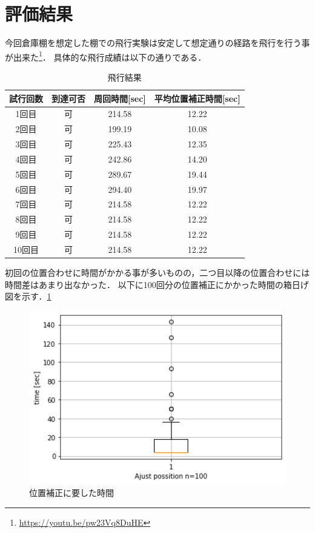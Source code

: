 \section{評価結果}
今回倉庫棚を想定した棚での飛行実験は安定して想定通りの経路を飛行を行う事が出来た\footnote{\url{https://youtu.be/pw23Vq8DuHE}}．
具体的な飛行成績は以下の通りである．

\begin{table}[h]
    \caption{飛行結果}
    \label{table:fly_result}
    \centering
    \begin{tabular}{cccc}
        \hline
        試行回数 & 到達可否 & 周回時間[sec] & 平均位置補正時間[sec] \\
        \hline \hline
        1回目 & 可 & 214.58 & 12.22 \\
        2回目 & 可 & 199.19 & 10.08 \\
        3回目 & 可 & 225.43 & 12.35 \\
        4回目 & 可 & 242.86 & 14.20 \\
        5回目 & 可 & 289.67 & 19.44 \\
        6回目 & 可 & 294.40 & 19.97 \\

        7回目 & 可 & 214.58 & 12.22 \\
        8回目 & 可 & 214.58 & 12.22 \\
        9回目 & 可 & 214.58 & 12.22 \\
        10回目 & 可 & 214.58 & 12.22 \\
        \hline
    \end{tabular}
\end{table}

初回の位置合わせに時間がかかる事が多いものの，二つ目以降の位置合わせには時間差はあまり出なかった．
以下に100回分の位置補正にかかった時間の箱日げ図を示す．\ref{box_plot}

\begin{figure}[htbp]
    \begin{center}
      \includegraphics[clip,width=15.0cm]{img/timedata.png}
      \caption{位置補正に要した時間}
      \label{box_plot}
    \end{center}
  \end{figure}